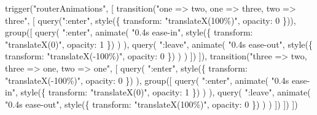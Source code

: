 \documentclass[
]{article}
\newenvironment{Shaded}{}{}
\newcommand{\DataTypeTok}[1]{\textcolor[rgb]{0.56,0.13,0.00}{#1}}
\newcommand{\DecValTok}[1]{\textcolor[rgb]{0.25,0.63,0.44}{#1}}
\newcommand{\FunctionTok}[1]{\textcolor[rgb]{0.02,0.16,0.49}{#1}}
\newcommand{\NormalTok}[1]{#1}
\newcommand{\OperatorTok}[1]{\textcolor[rgb]{0.40,0.40,0.40}{#1}}
\newcommand{\StringTok}[1]{\textcolor[rgb]{0.25,0.44,0.63}{#1}}
\begin{document}
\begin{enumerate}
\begin{Shaded}
\begin{Highlighting}[]
\FunctionTok{trigger}\NormalTok{(}\StringTok{"routerAnimations"}\OperatorTok{,}\NormalTok{ [}
  \FunctionTok{transition}\NormalTok{(}\StringTok{"one =\textgreater{} two, one =\textgreater{} three, two =\textgreater{} three"}\OperatorTok{,}\NormalTok{ [}
    \FunctionTok{query}\NormalTok{(}\StringTok{":enter"}\OperatorTok{,} \FunctionTok{style}\NormalTok{(\{ }\DataTypeTok{transform}\OperatorTok{:} \StringTok{"translateX(100\%)"}\OperatorTok{,} \DataTypeTok{opacity}\OperatorTok{:} \DecValTok{0}\NormalTok{ \}))}\OperatorTok{,}
    \FunctionTok{group}\NormalTok{([}
      \FunctionTok{query}\NormalTok{(}
        \StringTok{":enter"}\OperatorTok{,}
        \FunctionTok{animate}\NormalTok{(}
          \StringTok{"0.4s ease{-}in"}\OperatorTok{,}
          \FunctionTok{style}\NormalTok{(\{ }\DataTypeTok{transform}\OperatorTok{:} \StringTok{"translateX(0)"}\OperatorTok{,} \DataTypeTok{opacity}\OperatorTok{:} \DecValTok{1}\NormalTok{ \})}
\NormalTok{        )}
\NormalTok{      )}\OperatorTok{,}
      \FunctionTok{query}\NormalTok{(}
        \StringTok{":leave"}\OperatorTok{,}
        \FunctionTok{animate}\NormalTok{(}
          \StringTok{"0.4s ease{-}out"}\OperatorTok{,}
          \FunctionTok{style}\NormalTok{(\{}
            \DataTypeTok{transform}\OperatorTok{:} \StringTok{"translateX({-}100\%)"}\OperatorTok{,}
            \DataTypeTok{opacity}\OperatorTok{:} \DecValTok{0}
\NormalTok{          \})}
\NormalTok{        )}
\NormalTok{      )}
\NormalTok{    ])}
\NormalTok{  ])}\OperatorTok{,}
  \FunctionTok{transition}\NormalTok{(}\StringTok{"three =\textgreater{} two, three =\textgreater{} one, two =\textgreater{} one"}\OperatorTok{,}\NormalTok{ [}
    \FunctionTok{query}\NormalTok{(}
      \StringTok{":enter"}\OperatorTok{,}
      \FunctionTok{style}\NormalTok{(\{ }\DataTypeTok{transform}\OperatorTok{:} \StringTok{"translateX({-}100\%)"}\OperatorTok{,} \DataTypeTok{opacity}\OperatorTok{:} \DecValTok{0}\NormalTok{ \})}
\NormalTok{    )}\OperatorTok{,}
    \FunctionTok{group}\NormalTok{([}
      \FunctionTok{query}\NormalTok{(}
        \StringTok{":enter"}\OperatorTok{,}
        \FunctionTok{animate}\NormalTok{(}
          \StringTok{"0.4s ease{-}in"}\OperatorTok{,}
          \FunctionTok{style}\NormalTok{(\{ }\DataTypeTok{transform}\OperatorTok{:} \StringTok{"translateX(0)"}\OperatorTok{,} \DataTypeTok{opacity}\OperatorTok{:} \DecValTok{1}\NormalTok{ \})}
\NormalTok{        )}
\NormalTok{      )}\OperatorTok{,}
      \FunctionTok{query}\NormalTok{(}
        \StringTok{":leave"}\OperatorTok{,}
        \FunctionTok{animate}\NormalTok{(}
          \StringTok{"0.4s ease{-}out"}\OperatorTok{,}
          \FunctionTok{style}\NormalTok{(\{}
            \DataTypeTok{transform}\OperatorTok{:} \StringTok{"translateX(100\%)"}\OperatorTok{,}
            \DataTypeTok{opacity}\OperatorTok{:} \DecValTok{0}
\NormalTok{          \})}
\NormalTok{        )}
\NormalTok{      )}
\NormalTok{    ])}
\NormalTok{  ])}
\NormalTok{])}
\end{Highlighting}
\end{Shaded}
\end{enumerate}
\end{document}
